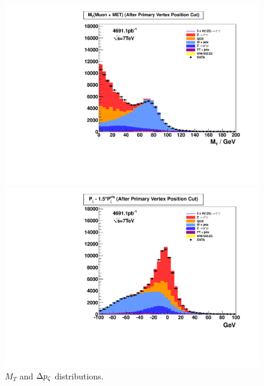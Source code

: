 \begin{figure}[ht]
  \begin{minipage}[b]{0.5\linewidth}
\centering
  \includegraphics[scale=0.35]{plots/plotAHtoMuTau_leptonSelection_18_afterEvtSelPrimaryEventVertexPositionForMuTau_beforeEvtSelDiTauCandidateForMuTauMt1MET_mtMuonMET_linear.pdf}
\end{minipage}
\hspace{0.5cm}
\begin{minipage}[b]{0.5\linewidth}
\centering
  \includegraphics[scale=0.35]{plots/plotAHtoMuTau_leptonSelection_18_afterEvtSelPrimaryEventVertexPositionForMuTau_beforeEvtSelDiTauCandidateForMuTauMt1MET_PzetaDiff_linear}
\end{minipage}
\caption{$M_{T}$ and $\Delta p_{\zeta}$ distributions.}
\label{fig:mtpzeta}
\end{figure}
